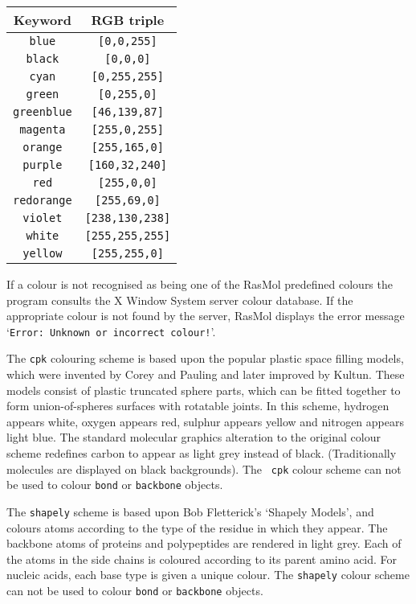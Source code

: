 \begin{center}\begin{tabular}{|c|c|} \hline
{\bf Keyword} & {\bf RGB triple} \\ \hline
{\tt blue}      & \verb"[0,0,255]"     \\
{\tt black}     & \verb"[0,0,0]"       \\
{\tt cyan}      & \verb"[0,255,255]"   \\
{\tt green}     & \verb"[0,255,0]"     \\
{\tt greenblue} & \verb"[46,139,87]"   \\ 
{\tt magenta}   & \verb"[255,0,255]"   \\
{\tt orange}    & \verb"[255,165,0]"   \\
{\tt purple}    & \verb"[160,32,240]"  \\
{\tt red}       & \verb"[255,0,0]"     \\
{\tt redorange} & \verb"[255,69,0]"    \\
{\tt violet}    & \verb"[238,130,238]" \\
{\tt white}     & \verb"[255,255,255]" \\
{\tt yellow}    & \verb"[255,255,0]"   \\ \hline
\end{tabular}\end{center}

If a colour is not recognised as being one of the RasMol predefined colours
the program consults the X Window System server colour database. If the
appropriate colour is not found by the server, RasMol displays the error
message `{\tt Error: Unknown or incorrect colour!}'.


The {\tt cpk} colouring scheme is based upon the popular plastic space
filling models, which were invented by Corey and Pauling and later 
improved by Kultun. These models consist of plastic truncated sphere
parts, which can be fitted together to form union-of-spheres surfaces
with rotatable joints. In this scheme, hydrogen appears white, oxygen 
appears red, sulphur appears yellow and nitrogen appears light blue. 
The standard molecular graphics alteration to the original colour 
scheme redefines carbon to appear as light grey instead of black. 
(Traditionally molecules are displayed on black backgrounds). The {\tt
cpk} colour scheme can not be used to colour {\tt bond} or {\tt backbone}
objects.

The {\tt shapely} scheme is based upon Bob Fletterick's `Shapely Models', 
and colours atoms according to the type of the residue in which they 
appear. The backbone atoms of proteins and polypeptides are rendered in 
light grey. Each of the atoms in the side chains is coloured according to
its parent amino acid. For nucleic acids, each base type is given a unique 
colour. The {\tt shapely} colour scheme can not be used to colour {\tt bond}
or {\tt backbone} objects.

